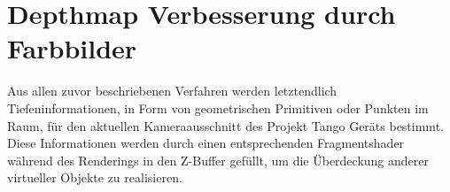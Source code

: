 \section{Depthmap Verbesserung durch Farbbilder}

Aus allen zuvor beschriebenen Verfahren werden letztendlich Tiefeninformationen,  in Form von geometrischen Primitiven oder Punkten im Raum, für den aktuellen Kameraausschnitt des Projekt Tango Geräts bestimmt. Diese Informationen werden durch einen entsprechenden Fragmentshader während des Renderings in den Z-Buffer gefüllt, um die Überdeckung anderer virtueller Objekte zu realisieren. 